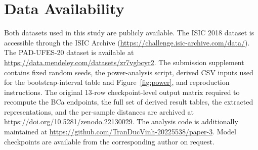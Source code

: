 \section*{Data Availability}

Both datasets used in this study are publicly available. The ISIC 2018 dataset is accessible through the ISIC Archive (\url{https://challenge.isic-archive.com/data/}). The PAD-UFES-20 dataset is available at \url{https://data.mendeley.com/datasets/zr7vgbcyr2}. The submission supplement contains fixed random seeds, the power-analysis script, derived CSV inputs used for the bootstrap-interval table and Figure~\ref{fig:power}, and reproduction instructions. The original 13-row checkpoint-level output matrix required to recompute the BCa endpoints, the full set of derived result tables, the extracted representations, and the per-sample distances are archived at \url{https://doi.org/10.5281/zenodo.22130029}. The analysis code is additionally maintained at \url{https://github.com/TranDucVinh-20225538/paper-3}. Model checkpoints are available from the corresponding author on request.
